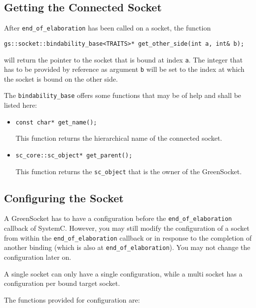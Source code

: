 \documentclass[a4paper,10pt]{article}          %
\begin{document}
\subsection{Getting the Connected Socket}

After \verb|end_of_elaboration| has been called on a socket, the function 

\verb|gs::socket::bindability_base<TRAITS>* get_other_side(int a, int& b);| 

will return the pointer to the socket that is bound at index \verb|a|. The integer that has to be provided by reference as argument \verb|b| will be set to the index at which the socket is bound on the other side.

The \verb|bindability_base| offers some functions that may be of help and shall be listed here:

\begin{itemize}
\item 
\verb|const char* get_name();|

This function returns the hierarchical name of the connected socket.

\item 
\verb|sc_core::sc_object* get_parent();|

This function returns the \verb|sc_object| that is the owner of the GreenSocket.

\end{itemize}


\subsection{Configuring the Socket}

A GreenSocket has to have a configuration before the \verb|end_of_elaboration| callback of SystemC. However, you may still modify the configuration of a socket from within the \verb|end_of_elaboration| callback or in response to the completion of another binding (which is also at \verb|end_of_elaboration|). You may not change the configuration later on.

A single socket can only have a single configuration, while a multi socket has a configuration per bound target socket.

The functions provided for configuration are:
\end{document}
